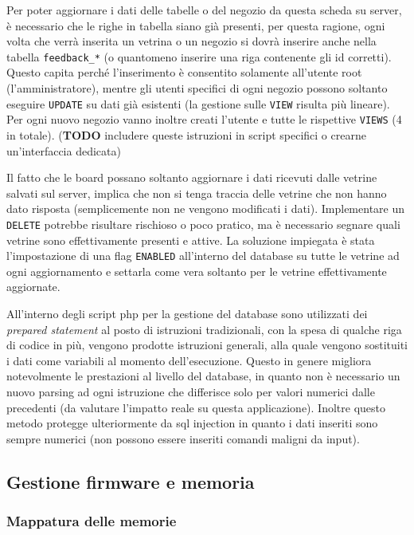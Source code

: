 Per poter aggiornare i dati delle tabelle o del negozio da questa scheda su server, \`e necessario che le righe in tabella siano gi\`a presenti, per questa ragione, ogni volta che verr\`a inserita un vetrina o un negozio si dovr\`a inserire anche nella tabella \texttt{feedback\_*} (o quantomeno inserire una riga contenente gli id corretti). Questo capita perch\'e l'inserimento \`e consentito solamente all'utente root (l'amministratore), mentre gli utenti specifici di ogni negozio possono soltanto eseguire \texttt{UPDATE} su dati gi\`a esistenti (la gestione sulle \texttt{VIEW} risulta pi\`u lineare). Per ogni nuovo negozio vanno inoltre creati l'utente e tutte le rispettive \texttt{VIEWS} (4 in totale). (\textbf{TODO} includere queste istruzioni in script specifici o crearne un'interfaccia dedicata)

Il fatto che le board possano soltanto aggiornare i dati ricevuti dalle vetrine salvati sul server, implica che non si tenga traccia delle vetrine che non hanno dato risposta (semplicemente non ne vengono modificati i dati). Implementare un \texttt{DELETE} potrebbe risultare rischioso o poco pratico, ma \`e necessario segnare quali vetrine sono effettivamente presenti e attive. La soluzione impiegata \`e stata l'impostazione di una flag \texttt{ENABLED} all'interno del database su tutte le vetrine ad ogni aggiornamento e settarla come vera soltanto per le vetrine effettivamente aggiornate.

All'interno degli script php per la gestione del database sono utilizzati dei \textit{prepared statement} al posto di istruzioni tradizionali, con la spesa di qualche riga di codice in pi\`u, vengono prodotte istruzioni generali, alla quale vengono sostituiti i dati come variabili al momento dell'esecuzione. Questo in genere migliora notevolmente le prestazioni al livello del database, in quanto non \`e necessario un nuovo parsing ad ogni istruzione che differisce solo per valori numerici dalle precedenti (da valutare l'impatto reale su questa applicazione). Inoltre questo metodo protegge ulteriormente da sql injection in quanto i dati inseriti sono sempre numerici (non possono essere inseriti comandi maligni da input).

\subsection{Gestione firmware e memoria}

\subsubsection{Mappatura delle memorie}

